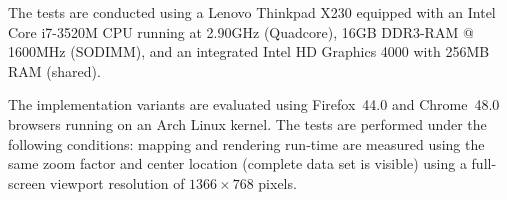       The tests are conducted using a Lenovo Thinkpad X230 equipped with an Intel Core
      i7-3520M CPU running at 2.90GHz (Quadcore), 16GB DDR3-RAM @ 1600MHz (SODIMM),
      and an integrated Intel HD Graphics 4000 with 256MB RAM (shared).\par
      The implementation variants are evaluated using Firefox~44.0 and Chrome~48.0
      browsers running on an Arch Linux kernel. The tests are performed under the
      following conditions: mapping and rendering run-time are measured
      using the same zoom factor and center location (complete data set is visible)
      using a full-screen viewport resolution of $1366 \times 768$ pixels.\par

